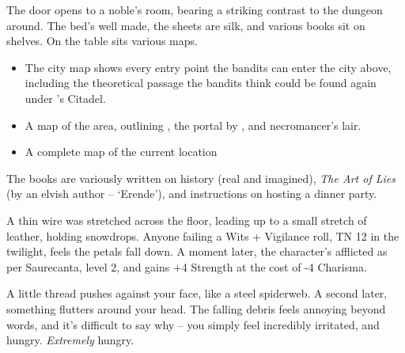 \begin{multicols}{2}
\label{sewerKingRoom}

\begin{boxtext}
  The door opens to a noble's room, bearing a striking contrast to the dungeon around.  The bed's well made, the sheets are silk, and various books sit on shelves.  On the table sits various maps.
\end{boxtext}

\begin{itemize}

  \item
  The city map shows every entry point the bandits can enter the city above, including the theoretical passage the bandits think could be found again under 's Citadel.

  \item
  A map of the area, outlining , the portal by , and \gls{necromancer}'s lair.

  \item
  A complete map of the current location

\end{itemize}

The books are variously written on history (real and imagined), \textit{The Art of Lies} (by an elvish author -- `Erende'), and instructions on hosting a dinner party.


A thin wire was stretched across the floor, leading up to a small stretch of leather, holding snowdrops.  Anyone failing a Wits + Vigilance roll, TN 12 in the twilight, feels the petals fall down.  A moment later, the character's afflicted as per Saurecanta, level 2, and gains +4 Strength at the cost of -4 Charisma.

\begin{boxtext}

  A little thread pushes against your face, like a steel spiderweb.
  A second later, something flutters around your head.
  The falling debris feels annoying beyond words, and it's difficult to say why -- you simply feel incredibly irritated, and hungry.
  \emph{Extremely} hungry.

\end{boxtext}


\begin{boxtext}


\end{boxtext}
\end{multicols}
